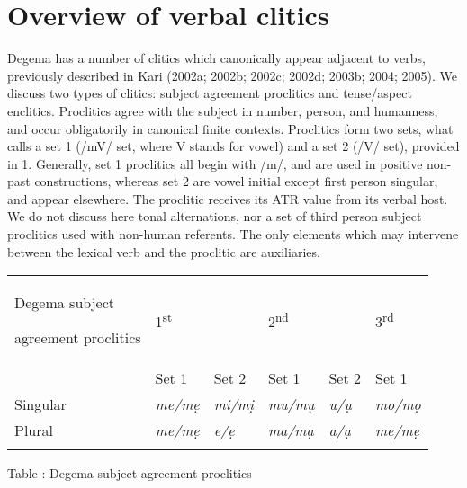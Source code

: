 \documentclass[output=paper]{langsci/langscibook}
\begin{document}
\section{Overview of verbal clitics}

Degema has a number of clitics which canonically appear adjacent to verbs, previously described in Kari (2002a; 2002b; 2002c; 2002d; 2003b; 2004; 2005). We discuss two types of clitics: subject agreement proclitics and tense/aspect enclitics. Proclitics agree with the subject in number, person, and humanness, and occur obligatorily in canonical finite contexts. Proclitics form two sets, what \citet[333-335]{Kari2004} calls a set 1 (/mV/ set, where V stands for vowel) and a set 2 (/V/ set), provided in 1. Generally, set 1 proclitics all begin with /m/, and are used in positive non-past constructions, whereas set 2 are vowel initial except first person singular, and appear elsewhere. The proclitic receives its ATR value from its verbal host. We do not discuss here tonal alternations, nor a set of third person subject proclitics used with non-human referents. The only elements which may intervene between the lexical verb and the proclitic are auxiliaries.

\begin{table}


\begin{tabularx}{\textwidth}{XXXXXX}
\lsptoprule

{Degema subject }

{agreement proclitics} & \multicolumn{2}{X}{ 1\textsuperscript{st}\par

} & \multicolumn{2}{X}{ 2\textsuperscript{nd}\par

} & 3\textsuperscript{rd}\par\\
\hhline{-~~~~~} & {Set 1} & {Set 2} & {Set 1} & {Set 2} & {Set 1}\\
{Singular} & {\itshape me/mẹ} & {\itshape mi/mị} & {\itshape mu/mụ} & {\itshape u/ụ} & {\itshape mo/mọ}\\
{Plural} & {\itshape me/mẹ} & {\itshape e/ẹ} & {\itshape ma/mạ} & {\itshape a/ạ} & {\itshape me/mẹ}\\
\lspbottomrule
\end{tabularx}
\label{bkm:Ref447870844}Table : Degema subject agreement proclitics
\end{table}
\end{document}
